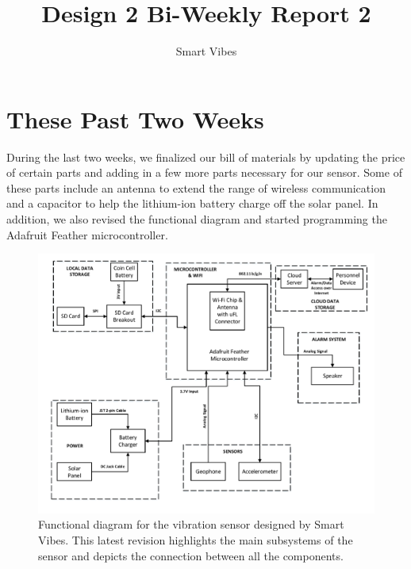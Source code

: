 \documentclass[12pt]{article}
\begin{document}
\title{Design 2 Bi-Weekly Report 2}
\author{Smart Vibes}
\maketitle

\newpage
\tableofcontents

\newpage
\section{These Past Two Weeks}
During the last two weeks, we finalized our bill of materials by updating the price of certain parts and adding in a few more parts necessary for our sensor. Some of these parts include an antenna to extend the range of wireless communication and a capacitor to help the lithium-ion battery charge off the solar panel. In addition, we also revised the functional diagram and started programming the Adafruit Feather microcontroller.

\begin{figure}[H]
    \centering
    \includegraphics[width=\textwidth]{src/functional_diagram.pdf}
    \caption{Functional diagram for the vibration sensor designed by Smart Vibes. This latest revision highlights the main subsystems of the sensor and depicts the connection between all the components.}
    \label{fig:gantt_chart}
\end{figure}
\end{document}
